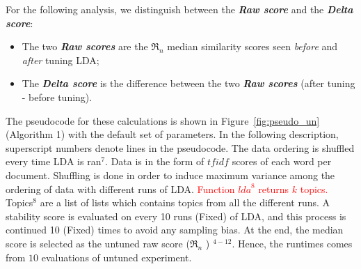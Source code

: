 \documentclass[twocolumn,5p,sort&compress]{elsarticle}
\renewcommand{\algorithmicrequire}{\textbf{Input:}}
\renewcommand{\algorithmicensure}{\textbf{Output:}}
\newcommand{\fig}[1]{Figure~\ref{fig:#1}}
\newcommand{\bi}{\begin{itemize}}
\newcommand{\ei}{\end{itemize}}
\theoremstyle{break}
\begin{document}
 For the following analysis,
we distinguish between the \textbf{\textit{Raw  score}} and the \textbf{\textit{Delta  score}}:
 \bi
\item The two \textbf{\textit{Raw  scores}} are the $\Re_n$ median similarity scores seen {\em before} and {\em after} tuning LDA;
\item The \textbf{\textit{Delta score}} is the difference between the two
  \textbf{\textit{Raw scores}} (after tuning - before tuning).  \ei 
  The pseudocode for these calculations
  is shown in \fig{pseudo_un} (Algorithm 1) with the default set of parameters. In the following
  description, superscript numbers denote lines in the pseudocode. The data ordering is
  shuffled every time LDA is ran$^{7}$. Data is in the form of $\mathit{tfidf}$
  scores of each word per document. Shuffling is done in order to induce maximum
  variance among the ordering of data with  different runs of LDA. \textcolor{red}{Function $\mathit{lda}^{8}$ returns $k$ topics.} Topics$^{8}$ are a list of lists which
  contains topics from all the different runs. A stability score is evaluated on
  every 10 runs (Fixed) of LDA, and this process is continued 10 (Fixed) times to avoid any sampling bias. At the end, the median
  score is selected as the untuned raw score ($\Re_n$ ) $^{4-12}$. Hence, the runtimes comes from $10$ evaluations of untuned experiment.

    
\end{document}
